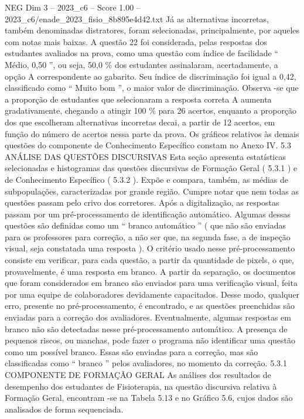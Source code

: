 \begin{textsample}{NEG Dim 3 – 2023\_c6 – Score 1.00 – 2023\_c6/enade\_2023\_fisio\_8b895e4d42.txt}
Já as alternativas incorretas, também denominadas distratores, foram selecionadas, principalmente, por aqueles com notas mais baixas.
A questão 22 foi considerada, pelas respostas dos estudantes avaliados na prova, como uma questão com índice de facilidade “ Médio, 0,50 ”, ou seja, 50,0 \% dos estudantes assinalaram, acertadamente, a opção A correspondente ao gabarito.
Seu índice de discriminação foi igual a 0,42, classificado como “ Muito bom ”, o maior valor de discriminação.
Observa -se que a proporção de estudantes que selecionaram a resposta correta A aumenta gradativamente, chegando a atingir 100 \% para 26 acertos, enquanto a proporção dos que escolheram alternativas incorretas decai, a partir de 12 acertos, em função do número de acertos nessa parte da prova.
Os gráficos relativos às demais questões do componente de Conhecimento Específico constam no Anexo IV. 5.3 ANÁLISE DAS QUESTÕES DISCURSIVAS Esta seção apresenta estatísticas selecionadas e histogramas das questões discursivas de Formação Geral ( 5.3.1 ) e de Conhecimento Específico ( 5.3.2 ).
Expõe e compara, também, as médias de subpopulações, caracterizadas por grande região.
Cumpre notar que nem todas as questões passam pelo crivo dos corretores.
Após a digitalização, as respostas passam por um pré-processamento de identificação automático.
Algumas dessas questões são definidas como um “ branco automático ” ( que não são enviadas para os professores para correção, a não ser que, na segunda fase, a de inspeção visual, seja constatada uma resposta ).
O critério usado nesse pré-processamento consiste em verificar, para cada questão, a partir da quantidade de pixels, o que, provavelmente, é uma resposta em branco.
A partir da separação, os documentos que foram considerados em branco são enviados para uma verificação visual, feita por uma equipe de colaboradores devidamente capacitados.
Desse modo, qualquer erro, presente no pré-processamento, é encontrado, e as questões preenchidas são enviadas para a correção dos avaliadores.
Eventualmente, algumas respostas em branco não são detectadas nesse pré-processamento automático.
A presença de pequenos riscos, ou manchas, pode fazer o programa não identificar uma questão como um possível branco.
Essas são enviadas para a correção, mas são classificadas como “ branco ” pelos avaliadores, no momento da correção. 5.3.1 COMPONENTE DE FORMAÇÃO GERAL As análises dos resultados de desempenho dos estudantes de Fisioterapia, na questão discursiva relativa à Formação Geral, encontram -se na Tabela 5.13 e no Gráfico 5.6, cujos dados são analisados de forma sequenciada.

\end{textsample}
